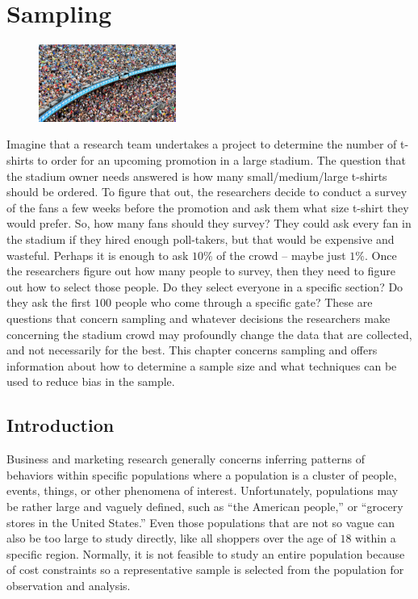 \chapter{Sampling}\label{07:sampling}

\begin{figure}
	\label{07:fig01} 
	\centering
	\includegraphics[width=0.4\textwidth]{gfx/07-01} 
\end{figure}
Imagine that a research team undertakes a project to determine the number of t-shirts to order for an upcoming promotion in a large stadium. The question that the stadium owner needs answered is how many small/medium/large t-shirts should be ordered. To figure that out, the researchers decide to conduct a survey of the fans a few weeks before the promotion and ask them what size t-shirt they would prefer. So, how many fans should they survey? They could ask every fan in the stadium if they hired enough poll-takers, but that would be expensive and wasteful. Perhaps it is enough to ask $ 10\% $ of the crowd -- maybe just $ 1\% $. Once the researchers figure out how many people to survey, then they need to figure out how to select those people. Do they select everyone in a specific section? Do they ask the first $ 100 $ people who come through a specific gate? These are questions that concern sampling and whatever decisions the researchers make concerning the stadium crowd may profoundly change the data that are collected, and not necessarily for the best. This chapter concerns sampling and offers information about how to determine a sample size and what techniques can be used to reduce bias in the sample.

\section{Introduction}

Business and marketing research generally concerns inferring patterns of behaviors within specific populations where a \gls{population} is a cluster of people, events, things, or other phenomena of interest. Unfortunately, populations may be rather large and vaguely defined, such as ``the American people,'' or ``grocery stores in the United States.'' Even those populations that are not so vague can also be too large to study directly, like all shoppers over the age of $ 18 $ within a specific region. Normally, it is not feasible to study an entire population because of cost constraints so a representative sample is selected from the population for observation and analysis. 

